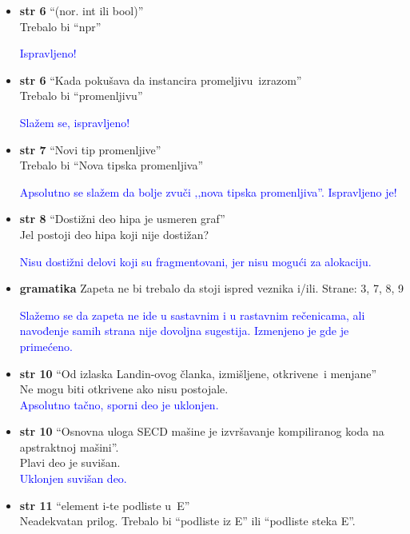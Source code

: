 \documentclass[a4paper]{report}
\newcommand{\odgovor}[1]{\textcolor{blue}{#1}}
\begin{document}
\begin{itemize}
\item \textbf{str 6} ``(\color{blue}nor\color{black}. int ili bool)'' \\ Trebalo bi ``npr''

\odgovor{Ispravljeno!}

\item \textbf{str 6} ``Kada pokušava da instancira \color{blue}promeljivu\color{black}~izrazom'' \\ Trebalo bi ``promenljivu''

\odgovor{Slažem se, ispravljeno!}

\item \textbf{str 7} ``Novi tip promenljive'' \\ Trebalo bi ``Nova tipska promenljiva''

\odgovor{Apsolutno se slažem da bolje zvuči ‚‚nova tipska promenljiva''. Ispravljeno je!}


\item \textbf{str 8} ``Dostižni deo hipa je usmeren graf'' \\ Jel postoji deo hipa koji nije dostižan?

\odgovor{Nisu dostižni delovi koji su fragmentovani, jer nisu mogući za alokaciju.}

\item \textbf{gramatika} Zapeta ne bi trebalo da stoji ispred veznika i/ili. Strane: 3, 7, 8, 9

\odgovor{Slažemo se da zapeta ne ide u sastavnim i u rastavnim rečenicama, ali navođenje samih strana nije dovoljna sugestija. Izmenjeno je gde je primećeno.}

\item \textbf{str 10} ``Od izlaska Landin-ovog članka, izmišljene, \color{blue}otkrivene\color{black}~i menjane'' \\ Ne mogu biti otkrivene ako nisu postojale.\\

\odgovor{Apsolutno tačno, sporni deo je uklonjen.}

\item \textbf{str 10} ``Osnovna uloga SECD mašine je izvršavanje kompiliranog koda \color{blue}na apstraktnoj mašini\color{black}''. \\ Plavi deo je suvišan.\\

\odgovor{Uklonjen suvišan deo.}

\item \textbf{str 11} ``element i-te podliste \color{blue}u\color{black}~E'' \\ Neadekvatan prilog. Trebalo bi ``podliste iz E'' ili ``podliste steka E''.


\end{itemize}
\end{document}
